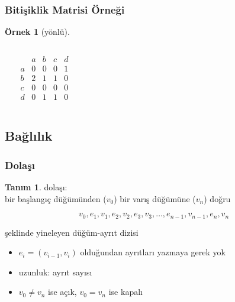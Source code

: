 \documentclass[dvipsnames]{beamer}
\theoremstyle{definition}
\newtheorem{tanim}[theorem]{Tanım}
\theoremstyle{example}
\newtheorem{ornek}[theorem]{Örnek}
\theoremstyle{plain}
\begin{document}
\begin{frame}
  \frametitle{Bitişiklik Matrisi Örneği}

  \begin{ornek}[yönlü]
    \begin{columns}
    \begin{center}
    \end{center}

      \[
        \begin{array}{c|cccc}
              & a & b & c & d\\\hline
            a & 0 & 0 & 0 & 1\\
            b & 2 & 1 & 1 & 0\\
            c & 0 & 0 & 0 & 0\\
            d & 0 & 1 & 1 & 0
        \end{array}
      \]
    \end{columns}
  \end{ornek}
\end{frame}

\subsection{Bağlılık}

\begin{frame}
  \frametitle{Dolaşı}

  \begin{tanim}
    \alert{dolaşı}:\\
    bir başlangıç düğümünden ($v_0$) bir varış düğümüne ($v_n$) doğru

    \[
      v_0,e_1,v_1,e_2,v_2,e_3,v_3,\dots,e_{n-1},v_{n-1},e_n,v_n
    \]

    şeklinde yineleyen düğüm-ayrıt dizisi
  \end{tanim}

  \pause
  \begin{itemize}
    \item $e_i=(v_{i-1},v_i)$ olduğundan ayrıtları yazmaya gerek yok

    \pause
    \medskip
    \item \alert{uzunluk}: ayrıt sayısı
    \item $v_0 \neq v_n$ ise \alert{açık}, $v_0 = v_n$ ise \alert{kapalı}
  \end{itemize}
\end{frame}
\end{document}
